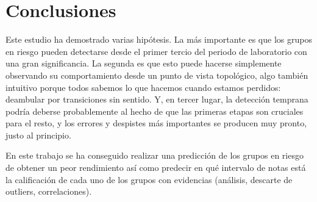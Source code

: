 \chapter{Conclusiones}\label{sec:chapterXIV}

Este estudio ha demostrado varias hipótesis. La más importante es que los grupos en riesgo pueden detectarse desde el primer tercio del periodo de laboratorio con una gran significancia. La segunda es que esto puede hacerse simplemente observando su comportamiento desde un punto de vista topológico, algo también intuitivo porque todos sabemos lo que hacemos cuando estamos perdidos: deambular por transiciones sin sentido. Y, en tercer lugar, la detección temprana podría deberse probablemente al hecho de que las primeras etapas son cruciales para el resto, y los errores y despistes más importantes se producen muy pronto, justo al principio.

En este trabajo se ha conseguido realizar una predicción de los grupos en riesgo de obtener un peor rendimiento así como predecir en qué intervalo de notas está la calificación de cada uno de los grupos con evidencias (análisis, descarte de outliers, correlaciones).